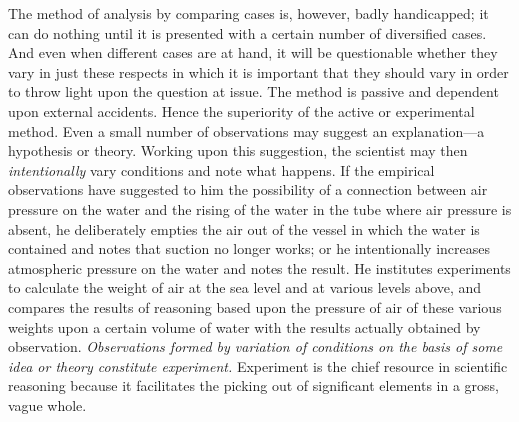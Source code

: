 \documentclass[showtrims,ustradepaper]{memoir}
\begin{document}

The method of analysis by comparing cases is, however, badly
handicapped; it can do nothing until it is presented with a certain
number of diversified cases. And even when different cases are at hand,
it will be questionable whether they vary in just these respects in
which it is important that they should vary in order to throw light upon
the question at issue. The method is passive and dependent upon external
accidents. Hence the superiority of the active or experimental method.
Even a small number of observations may suggest an explanation---a
hypothesis or theory. Working upon this suggestion, the scientist may
then \emph{intentionally} vary conditions and note what happens. If the
empirical observations have suggested to him the possibility of a
connection between air pressure on the water and the rising of the water
in the tube where air pressure is absent, he deliberately empties the
air out of the vessel in which the water is contained and notes that
suction no longer works; or he intentionally increases atmospheric
pressure on the water and notes the result. He institutes experiments to
calculate the weight of air at the sea level and at various levels
above, and compares the results of reasoning based upon the pressure of
air
of these various weights upon a certain volume of water with the results
actually obtained by observation. \emph{Observations formed by variation
of conditions on the basis of some idea or theory constitute
experiment.} Experiment is the chief resource in scientific reasoning
because it facilitates the picking out of significant elements in a
gross, vague whole.

\end{document}
